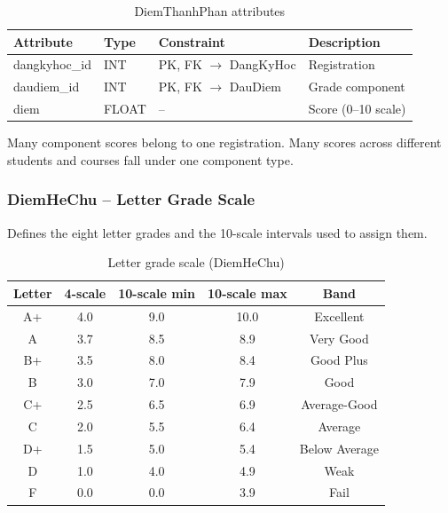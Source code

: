 \documentclass[12pt,a4paper]{report}
\begin{document}
\begin{table}[H]
\renewcommand{\arraystretch}{1.35}
\caption{DiemThanhPhan attributes}
\label{tab:diemthanhphan}
\begin{tabular}{|p{3cm}|p{2.5cm}|p{3cm}|p{5cm}|}
  \hline
  \textbf{Attribute} & \textbf{Type} & \textbf{Constraint} & \textbf{Description} \\
  \hline
  dangkyhoc\_id & INT & PK, FK $\to$ DangKyHoc & Registration \\
  \hline
  daudiem\_id & INT & PK, FK $\to$ DauDiem & Grade component \\
  \hline
  diem & FLOAT & -- & Score (0--10 scale) \\
  \hline
\end{tabular}
\end{table}

Many component scores belong to one registration. Many scores across different students and courses fall under one component type.

\subsubsection{DiemHeChu -- Letter Grade Scale}

Defines the eight letter grades and the 10-scale intervals used to assign them.

\begin{table}[H]
\renewcommand{\arraystretch}{1.35}
\caption{Letter grade scale (DiemHeChu)}
\label{tab:gradescale}
\begin{tabular}{|c|c|c|c|c|}
  \hline
  \textbf{Letter} & \textbf{4-scale} & \textbf{10-scale min} & \textbf{10-scale max} & \textbf{Band} \\
  \hline
  A+  & 4.0 & 9.0 & 10.0 & Excellent \\
    \hline
  A  & 3.7 & 8.5 & 8.9 & Very Good \\
  \hline
  B+ & 3.5 & 8.0 & 8.4  & Good Plus \\
  \hline
  B  & 3.0 & 7.0 & 7.9  & Good \\
  \hline
  C+ & 2.5 & 6.5 & 6.9  & Average-Good \\
  \hline
  C  & 2.0 & 5.5 & 6.4  & Average \\
  \hline
  D+ & 1.5 & 5.0 & 5.4  & Below Average \\
  \hline
  D  & 1.0 & 4.0 & 4.9  & Weak \\
  \hline
  F  & 0.0 & 0.0 & 3.9  & Fail \\
  \hline
\end{tabular}
\end{table}
\end{document}
